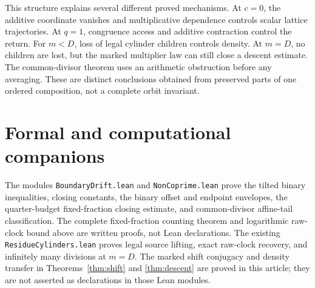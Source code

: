 \documentclass[11pt,letterpaper]{article}
\begin{document}
This structure explains several different proved mechanisms.
At \(c=0\), the additive coordinate vanishes and multiplicative
dependence controls scalar lattice trajectories. At \(q=1\),
congruence access and additive contraction control the return.
For \(m<D\), loss of legal cylinder children controls density.
At \(m=D\), no children are lost, but the marked multiplier law
can still close a descent estimate. The common-divisor theorem
uses an arithmetic obstruction before any averaging.
These are distinct conclusions obtained from preserved parts
of one ordered composition, not a complete orbit invariant.

\section{Formal and computational companions}

The modules \texttt{BoundaryDrift.lean} and \texttt{NonCoprime.lean}
prove the tilted binary inequalities, closing constants, the binary
offset and endpoint envelopes, the quarter-budget fixed-fraction
closing estimate, and common-divisor affine-tail classification.
The complete fixed-fraction counting theorem and logarithmic raw-clock
bound above are written proofs, not Lean declarations. The existing
\texttt{ResidueCylinders.lean} proves legal source lifting, exact
raw-clock recovery, and infinitely many divisions at \(m=D\).
The marked shift conjugacy and density transfer in
Theorems~\ref{thm:shift} and \ref{thm:descent} are proved in this article;
they are not asserted as declarations in those Lean modules.



\end{document}
